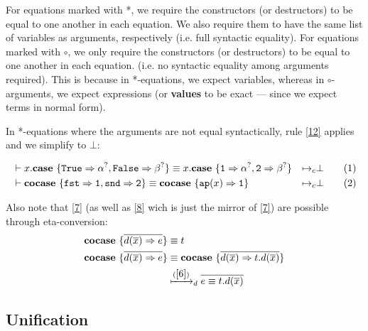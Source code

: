 \documentclass[twoside,12pt,a4paper]{article}
\begin{document}
For equations marked with *, we require the constructors (or destructors) to be equal to one another in each equation. 
We also require them to have the same list of variables as arguments, respectively (i.e. full syntactic equality).
For equations marked with $\circ$, we only require the constructors (or destructors) to be equal to one another in each equation. 
(i.e. no syntactic equality among arguments required).
This is because in *-equations, we expect variables, whereas in $\circ$-arguments, we expect expressions (or \textbf{values} to be exact --- since we expect terms in normal form).

In *-equations where the arguments are not equal syntactically, rule \cref{12} applies and we simplify to $\bot$:

\begin{example}
    \begin{align}
        &\vdash x.\textbf{case}\ \{\mathtt{True\Rightarrow \alpha^?, False \Rightarrow \beta^?}\} 
        \equiv x.\textbf{case}\ \{\mathtt{1\Rightarrow \alpha^?, 2\Rightarrow\beta^?}\}
        &\mapsto_c& \bot \tag{1}\\
        &\vdash \textbf{cocase}\ \{\mathtt{fst\Rightarrow 1, snd\Rightarrow 2}\}
        \equiv \textbf{cocase}\ \{\texttt{ap}(x)\Rightarrow \mathtt{1}\}
        &\mapsto_c& \bot \tag{2}
    \end{align}
\end{example}

Also note that \cref{7} (as well as \cref{8} wich is just the mirror of \cref{7}) are possible through eta-conversion:
\begin{align*}
    \excopatmatch{\overline{d(\overline{x})\Rightarrow e}}&\equiv t \\
    \excopatmatch{\overline{d(\overline{x})\Rightarrow e}}&\equiv \excopatmatch{\overline{d(\overline{x})\Rightarrow t.d(\overline{x})}}\\
    &\xmapsto{(\cref{6})}_d \overline{e \equiv t.d(\overline{x})}
\end{align*}

\subsection{Unification}
\end{document}
